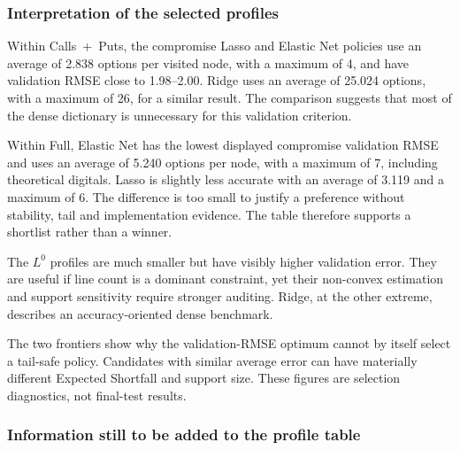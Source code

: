 \subsubsection*{Interpretation of the selected profiles}

Within Calls~+~Puts, the compromise Lasso and Elastic Net policies use an average
of 2.838 options per visited node, with a maximum of 4, and have validation RMSE
close to 1.98--2.00. Ridge uses an average of 25.024 options, with a maximum of 26,
for a similar result. The comparison suggests that most of the dense
dictionary is unnecessary for this validation criterion.

Within Full, Elastic Net has the lowest displayed compromise validation RMSE and
uses an average of 5.240 options per node, with a maximum of 7, including theoretical
digitals. Lasso is slightly less accurate with an average of 3.119 and a maximum
of 6. The difference is too small to justify a preference
without stability, tail and implementation evidence. The table therefore
supports a shortlist rather than a winner.

The $L^0$ profiles are much smaller but have visibly higher validation error.
They are useful if line count is a dominant constraint, yet their non-convex
estimation and support sensitivity require stronger auditing. Ridge, at the
other extreme, describes an accuracy-oriented dense benchmark.



The two frontiers show why the validation-RMSE optimum cannot by itself select
a tail-safe policy. Candidates with similar average error can have materially
different Expected Shortfall and support size. These figures are selection
diagnostics, not final-test results.

\subsubsection*{Information still to be added to the profile table}

